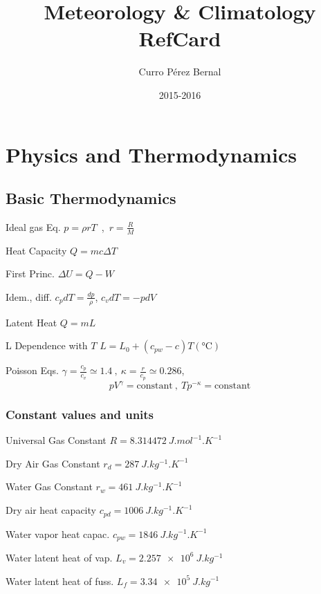 \documentclass[10pt]{article}
\title{Meteorology \& Climatology RefCard}
\author{Curro Pérez Bernal}
\date{2015-2016}
\renewcommand{\maketitle}{%
{\begin{center}\Large \mythetitle\end{center}}
}
\newcommand{\gc}{\degreeCelsius}
\begin{document}
\begin{multicols}{3}
\maketitle

\section{Physics and Thermodynamics}

\subsection{Basic Thermodynamics}
\begin{ttdesc}[labelwidth=\widthof{\texttt{report}}]
\item[Ideal gas Eq.] $p = \rho r T$~,~$r = \frac{R}{M}$
\item[Heat Capacity] $Q = m c \Delta T$
\item[First Princ.] $\Delta U = Q - W$
\item[Idem., diff.] $c_pdT = \frac{dp}{\rho}$, $c_vdT = -pdV$
\item[Latent Heat] $Q = m L$
\item[L Dependence with $T$] $L=L_0 + (c_{pw}-c) T (\si{\gc})$
\item[Poisson Eqs.] $\gamma = \frac{c_p}{c_v}\simeq 1.4~,~\kappa = \frac{r}{c_p}\simeq 0.286$, 
\begin{displaymath}
  p V^\gamma = \text{constant}~,~T p^{-\kappa} = \text{constant}
\end{displaymath}
\end{ttdesc}
\subsubsection{Constant values and units}
%
\begin{ttdesc}[labelwidth=\widthof{\ttfamily{letterpaper/a4paper}}]
\item[Universal Gas Constant] $R = \SI{8.314472}{J.mol^{-1}.K^{-1}}$
\item[Dry Air Gas Constant] $r_d = \SI{287}{J.kg^{-1}.K^{-1}}$
\item[Water Gas Constant] $r_w = \SI{461}{J.kg^{-1}.K^{-1}}$
\item[Dry air heat capacity] $c_{pd} = \SI{1006}{J.kg^{-1}.K^{-1}}$
\item[Water vapor heat capac.] $c_{pw} = \SI{1846}{J.kg^{-1}.K^{-1}}$
\item[Water latent heat of vap.] $L_{v} = \SI{2.257e6}{J.kg^{-1}}$
\item[Water latent heat of fuss.] $L_{f} = \SI{3.34e5}{J.kg^{-1}}$
\end{ttdesc}


\end{multicols}
\end{document}
